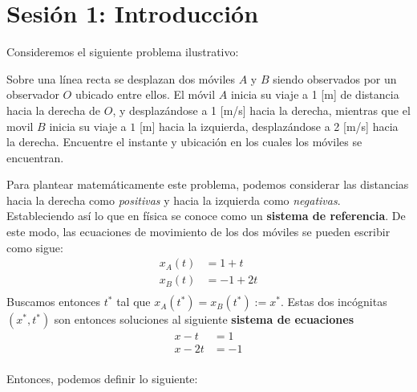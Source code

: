 \section{Sesión 1: Introducción}

Consideremos el siguiente problema ilustrativo:

\begin{tcolorbox}[title={Problema introductorio}]
    Sobre una línea recta se desplazan dos móviles $A$ y $B$ siendo observados por un observador $O$ ubicado entre ellos. El móvil $A$ inicia su viaje a 1 [m] de distancia hacia la derecha de $O$, y desplazándose a 1 [m/s] hacia la derecha, mientras que el movil $B$ inicia su viaje a $1$ [m] hacia la izquierda, desplazándose a 2 [m/s] hacia la derecha. Encuentre el instante y ubicación en los cuales los móviles se encuentran.
\end{tcolorbox}

Para plantear matemáticamente este problema, podemos considerar las distancias hacia la derecha como \textit{positivas} y hacia la izquierda como \textit{negativas}. Estableciendo así lo que en física se conoce como un \textbf{sistema de referencia}. De este modo, las ecuaciones de movimiento de los dos móviles se pueden escribir como sigue:
\begin{align*}
    x_A(t) &= 1 + t \\
    x_B(t) &= -1 + 2t \\
\end{align*}
Buscamos entonces $t^*$ tal que $x_A(t^*) = x_B(t^*) := x^*$. Estas dos incógnitas $(x^*, t^*)$ son entonces soluciones al siguiente \textbf{sistema de ecuaciones}
\begin{align*}
    x - t &= 1 \\
    x - 2t &= -1 \\
\end{align*}

Entonces, podemos definir lo siguiente:

